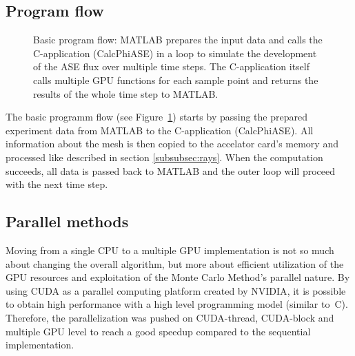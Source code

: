 \subsection{Program flow}
\label{subsec:program_flow}
\begin{figure}[H]
  \centerline
      {}
  \caption{Basic program flow: MATLAB prepares the input data and
    calls the C-application (CalcPhiASE) in a loop to simulate the
    development of the ASE flux over multiple time steps. The
    C-application itself calls multiple GPU functions for each sample
    point and returns the results of the whole time step to MATLAB.}
  \label{graphic:pap1}
\end{figure}
The basic programm flow (see Figure~\ref{graphic:pap1}) starts by
passing the prepared experiment data from MATLAB \cite{matlab} to the
C-application (CalcPhiASE). All information about the mesh is then
copied to the accelator card's memory and processed like described in
section \ref{subsubsec:rays}. When the computation succeeds, all data
is passed back to MATLAB and the outer loop will proceed with the next
time step.

\subsection{Parallel methods}
\label{subsec:parallel_methods}
Moving from a single CPU to a multiple GPU implementation is not so
much about changing the overall algorithm, but more about efficient
utilization of the GPU resources and exploitation of the Monte Carlo
Method's parallel nature. By using CUDA\cite{cuda} as a parallel
computing platform created by NVIDIA\cite{nvidia}, it is possible to
obtain high performance with a high level programming model (similar
to~C). Therefore, the parallelization was pushed on CUDA-thread,
CUDA-block and multiple GPU level to reach a good speedup compared to
the sequential implementation.

